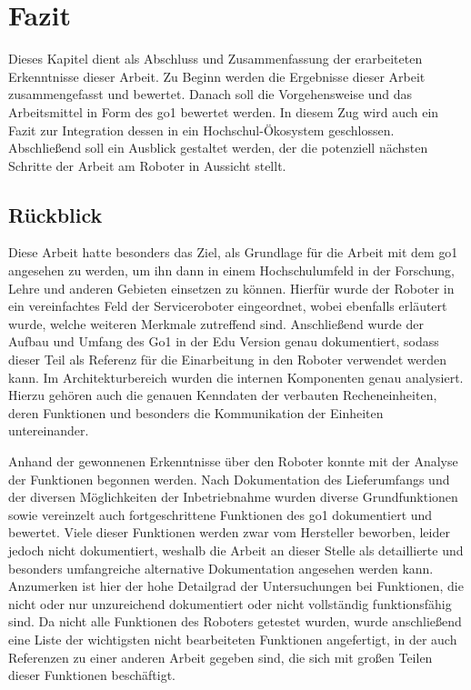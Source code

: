 \clearpage

\section{Fazit}
\label{sec:fazit}

Dieses Kapitel dient als Abschluss und Zusammenfassung der erarbeiteten Erkenntnisse dieser Arbeit.
Zu Beginn werden die Ergebnisse dieser Arbeit zusammengefasst und bewertet.
Danach soll die Vorgehensweise und das Arbeitsmittel in Form des \gls{go1} bewertet werden.
In diesem Zug wird auch ein Fazit zur Integration dessen in ein Hochschul-Ökosystem geschlossen.
Abschließend soll ein Ausblick gestaltet werden, der die potenziell nächsten Schritte der Arbeit am Roboter in Aussicht stellt.

\subsection{Rückblick}
\label{subsec:ruckblick}

Diese Arbeit hatte besonders das Ziel, als Grundlage für die Arbeit mit dem \gls{go1} angesehen zu werden, um ihn dann in einem
Hochschulumfeld in der Forschung, Lehre und anderen Gebieten einsetzen zu können.
Hierfür wurde der Roboter in ein vereinfachtes Feld der Serviceroboter eingeordnet, wobei ebenfalls erläutert wurde, welche weiteren
Merkmale zutreffend sind.
Anschließend wurde der Aufbau und Umfang des Go1 in der Edu Version genau dokumentiert, sodass dieser Teil als Referenz für die
Einarbeitung in den Roboter verwendet werden kann.
Im Architekturbereich wurden die internen Komponenten genau analysiert.
Hierzu gehören auch die genauen Kenndaten der verbauten Recheneinheiten, deren Funktionen und besonders die Kommunikation
der Einheiten untereinander.

Anhand der gewonnenen Erkenntnisse über den Roboter konnte mit der Analyse der Funktionen begonnen werden.
Nach Dokumentation des Lieferumfangs und der diversen Möglichkeiten der Inbetriebnahme wurden diverse Grundfunktionen sowie
vereinzelt auch fortgeschrittene Funktionen des \gls{go1} dokumentiert und bewertet.
Viele dieser Funktionen werden zwar vom Hersteller beworben, leider jedoch nicht dokumentiert, weshalb die Arbeit
an dieser Stelle als detaillierte und besonders umfangreiche alternative Dokumentation angesehen werden kann.
Anzumerken ist hier der hohe Detailgrad der Untersuchungen bei Funktionen, die nicht oder nur unzureichend
dokumentiert oder nicht vollständig funktionsfähig sind.
Da nicht alle Funktionen des Roboters getestet wurden, wurde anschließend eine Liste der wichtigsten nicht bearbeiteten Funktionen
angefertigt, in der auch Referenzen zu einer anderen Arbeit gegeben sind, die sich mit großen Teilen dieser
Funktionen beschäftigt.

